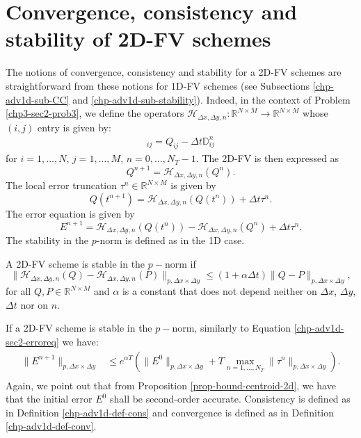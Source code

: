 \section{Convergence, consistency and stability of 2D-FV schemes}
\label{chp3-CCS}
The notions of convergence, consistency and stability for a 2D-FV schemes
are straightforward from these notions for 1D-FV schemes
(see Subsections \ref{chp-adv1d-sub-CC} and \ref{chp-adv1d-sub-stability}).
Indeed, in the context of Problem \ref{chp3-sec2-prob3}, we define the operators
$\mathcal{H}_{\Delta x ,\Delta y,n}: \mathbb{R}^{N \times M} \to \mathbb{R}^{N \times M}$ whose $(i,j)$ entry is given by:
\begin{align*}
	[\mathcal{H}_{\Delta x ,\Delta y,n}(Q)]_{ij} = Q_{ij} - \Delta t\mathbb{D}_{ij}^n
\end{align*}
for $i=1, \ldots, N$, $j=1, \ldots, M$, $n=0, \ldots, N_T-1$. The 2D-FV is then expressed as
\begin{equation*}
	Q^{n+1} = \mathcal{H}_{\Delta x ,\Delta y,n}(Q^n).
\end{equation*}
The local error truncation $\tau^n \in \mathbb{R}^{N \times M}$ is given by
\begin{equation*}
	Q(t^{n+1}) = \mathcal{H}_{\Delta x ,\Delta y,n}(Q(t^n)) + \Delta t \tau^n.
\end{equation*}
The error equation is given by
\begin{equation}
	E^{n+1} = \mathcal{H}_{\Delta x ,\Delta y,n}(Q(t^n)) - \mathcal{H}_{\Delta x ,\Delta y,n}(Q^n) +  \Delta t \tau^n.
\end{equation}
The stability in the $p$-norm is defined as in the 1D case.
\begin{definition}
	A 2D-FV scheme is stable in the $p-$norm if 
	\begin{equation}
		\|\mathcal{H}_{\Delta x ,\Delta y,n}(Q) - \mathcal{H}_{\Delta x ,\Delta y,n}(P)\|_{p,\Delta x \times \Delta y} \leq (1+\alpha \Delta t)  \|Q-P\|_{p,\Delta x \times \Delta y},
	\end{equation}
	for all $Q, P \in \mathbb{R}^{N\times M}$ and $\alpha$ is a constant
	that does not depend neither on $\Delta x$, $\Delta y$, $\Delta t$ nor on $n$.
\end{definition}
If a 2D-FV scheme is stable in the $p-$norm, similarly to Equation \eqref{chp-adv1d-sec2-erroreq} we have:
\begin{align*}
		\|E^{n+1}\|_{p,\Delta x \times \Delta y} &\leq e^{\alpha T}(\|E^0\|_{p,\Delta x \times \Delta y} + T\max_{n=1, \ldots, N_T}\|\tau^n\|_{p,\Delta x \times \Delta y}).\\
\end{align*}
Again, we point out that from Proposition \ref{prop-bound-centroid-2d}, we have that the initial error $E^0$ shall be second-order accurate.
Consistency is defined as in Definition \ref{chp-adv1d-def-cons} and convergence is defined as in Definition \ref{chp-adv1d-def-conv}.

